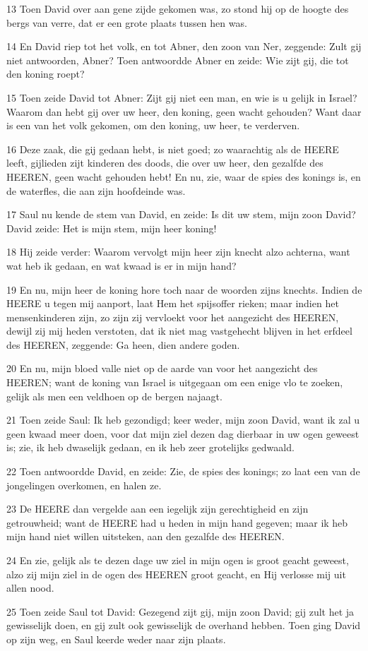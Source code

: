 \par 13 Toen David over aan gene zijde gekomen was, zo stond hij op de hoogte des bergs van verre, dat er een grote plaats tussen hen was.
\par 14 En David riep tot het volk, en tot Abner, den zoon van Ner, zeggende: Zult gij niet antwoorden, Abner? Toen antwoordde Abner en zeide: Wie zijt gij, die tot den koning roept?
\par 15 Toen zeide David tot Abner: Zijt gij niet een man, en wie is u gelijk in Israel? Waarom dan hebt gij over uw heer, den koning, geen wacht gehouden? Want daar is een van het volk gekomen, om den koning, uw heer, te verderven.
\par 16 Deze zaak, die gij gedaan hebt, is niet goed; zo waarachtig als de HEERE leeft, gijlieden zijt kinderen des doods, die over uw heer, den gezalfde des HEEREN, geen wacht gehouden hebt! En nu, zie, waar de spies des konings is, en de waterfles, die aan zijn hoofdeinde was.
\par 17 Saul nu kende de stem van David, en zeide: Is dit uw stem, mijn zoon David? David zeide: Het is mijn stem, mijn heer koning!
\par 18 Hij zeide verder: Waarom vervolgt mijn heer zijn knecht alzo achterna, want wat heb ik gedaan, en wat kwaad is er in mijn hand?
\par 19 En nu, mijn heer de koning hore toch naar de woorden zijns knechts. Indien de HEERE u tegen mij aanport, laat Hem het spijsoffer rieken; maar indien het mensenkinderen zijn, zo zijn zij vervloekt voor het aangezicht des HEEREN, dewijl zij mij heden verstoten, dat ik niet mag vastgehecht blijven in het erfdeel des HEEREN, zeggende: Ga heen, dien andere goden.
\par 20 En nu, mijn bloed valle niet op de aarde van voor het aangezicht des HEEREN; want de koning van Israel is uitgegaan om een enige vlo te zoeken, gelijk als men een veldhoen op de bergen najaagt.
\par 21 Toen zeide Saul: Ik heb gezondigd; keer weder, mijn zoon David, want ik zal u geen kwaad meer doen, voor dat mijn ziel dezen dag dierbaar in uw ogen geweest is; zie, ik heb dwaselijk gedaan, en ik heb zeer grotelijks gedwaald.
\par 22 Toen antwoordde David, en zeide: Zie, de spies des konings; zo laat een van de jongelingen overkomen, en halen ze.
\par 23 De HEERE dan vergelde aan een iegelijk zijn gerechtigheid en zijn getrouwheid; want de HEERE had u heden in mijn hand gegeven; maar ik heb mijn hand niet willen uitsteken, aan den gezalfde des HEEREN.
\par 24 En zie, gelijk als te dezen dage uw ziel in mijn ogen is groot geacht geweest, alzo zij mijn ziel in de ogen des HEEREN groot geacht, en Hij verlosse mij uit allen nood.
\par 25 Toen zeide Saul tot David: Gezegend zijt gij, mijn zoon David; gij zult het ja gewisselijk doen, en gij zult ook gewisselijk de overhand hebben. Toen ging David op zijn weg, en Saul keerde weder naar zijn plaats.

